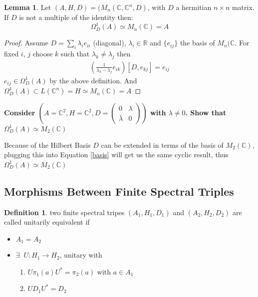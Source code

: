 \documentclass[a4paper]{article}
\newcounter{exercise}
\newenvironment{MyExercise}%
{\begin{mdframed}[style=exercisestyle]}{\end{mdframed}}
\theoremstyle{definition}
\newtheorem{definition}{Definition}
\theoremstyle{definition}
\theoremstyle{definition}
\theoremstyle{theorem}
\theoremstyle{theorem}
\newtheorem{lemma}{Lemma}
\begin{document}
\begin{lemma}
    Let $(A, H, D) = (M_n(\mathbb{C}, \mathbb{C}^n, D)$, with $D$ a hermitian
    $n\times n$ matrix. If $D$ is not a multiple of the identity then:
    \begin{equation}
        \Omega _D ^1 (A)  \simeq  M_n(\mathbb{C}) = A
    \end{equation}
\end{lemma}

\begin{proof}
    Assume $D = \sum _i \lambda _i e_{ii}$ (diagonal), $\lambda _i \in \mathbb{R}$ and
    $\{e_{ij}\}$ the basis of $M_n(\mathbb{C}$. For fixed $i$, $j$ choose $k$
    such that $\lambda _k \neq \lambda _j$ then
    \begin{align} \label{basis}
        \left(\frac{1}{\lambda _k - \lambda _j} e_{ik}\right) [D, e_{kj}] =
        e_{ij}
    \end{align}
    $e_{ij}\in \Omega _D ^1 (A)$ by the above definition. And $\Omega _D ^1
    (A) \subset L(\mathbb{C}^n) = H \simeq M_n(\mathbb{C}) = A$
\end{proof}

\begin{MyExercise}
    \textbf{
     Consider $(A=\mathbb{C}^2, H=\mathbb{C}^2,
     D = \begin{pmatrix} 0 & \lambda \\ \bar{\lambda} & 0
     \end{pmatrix})$ with $\lambda \neq 0$. Show that $\Omega _D^1(A)
     \simeq M_2(\mathbb{C})$
 }
\newline

    Because of the Hilbert Basis $D$ can be extended in terms of
    the basis of $M_2(\mathbb{C})$, plugging this into Equation
    \ref{basis} will get us the same cyclic result, thus
    $\Omega _D^1(A) \simeq M_2(\mathbb{C})$
\
\end{MyExercise}

\subsection{Morphisms Between Finite Spectral Triples}
\begin{definition}
    two finite spectral tripes $(A_1, H_1, D_1)$ and $(A_2, H_2, D_2)$ are
    called unitarily equivalent if
    \begin{itemize}
        \item $A_1 = A_2$
        \item $\exists \;\; U: H_1 \rightarrow H_2$, unitary with
            \begin{enumerate}
                \item  $U\pi_1(a)U^* = \pi_2(a)$ with $a \in A_1$
                \item  $UD_1 U^* = D_2$
            \end{enumerate}
    \end{itemize}
\end{definition}
\end{document}
